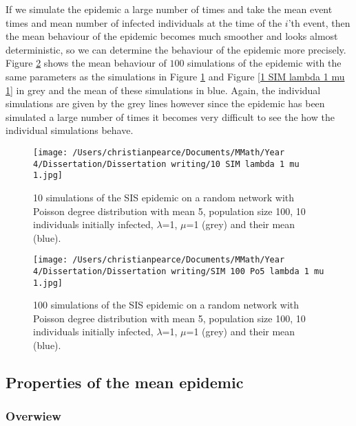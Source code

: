 \documentclass{uonmathsreport}
\begin{document}
If we simulate the epidemic a large number of times and take the mean event times and mean number of infected individuals at the time of the $i$’th event, then the mean behaviour of the epidemic becomes much smoother and looks almost deterministic, so we can determine the behaviour of the epidemic more precisely. Figure \ref{SIM 100 Po5 lambda 1 mu 1} shows the mean behaviour of $100$ simulations of the epidemic with the same parameters as the simulations in Figure \ref{10 SIM lambda 1 mu 1} and Figure \ref{1 SIM lambda 1 mu 1} in grey and the mean of these simulations in blue. Again, the individual simulations are given by the grey lines however since the epidemic has been simulated a large number of times it becomes very difficult to see the how the individual simulations behave.

\begin{figure}
\begin{center}
\texttt{[image: /Users/christianpearce/Documents/MMath/Year 4/Dissertation/Dissertation writing/10 SIM lambda 1 mu 1.jpg]}
\end{center}
\caption{10 simulations of the SIS epidemic on a random network with Poisson degree distribution with mean 5, population size 100, 10 individuals initially infected, $\lambda$=1, $\mu$=1 (grey) and their mean (blue).}
\label{10 SIM lambda 1 mu 1}
\end{figure}

\begin{figure}
\begin{center}
\texttt{[image: /Users/christianpearce/Documents/MMath/Year 4/Dissertation/Dissertation writing/SIM 100 Po5 lambda 1 mu 1.jpg]}
\end{center}
\caption{100 simulations of the SIS epidemic on a random network with Poisson degree distribution with mean 5, population size 100, 10 individuals initially infected, $\lambda$=1, $\mu$=1 (grey) and their mean (blue).}
\label{SIM 100 Po5 lambda 1 mu 1}
\end{figure}

\subsection{Properties of the mean epidemic}
\label{subsub:5.4}

\subsubsection{Overwiew} \label{subsub:5.4.1}
\end{document}

